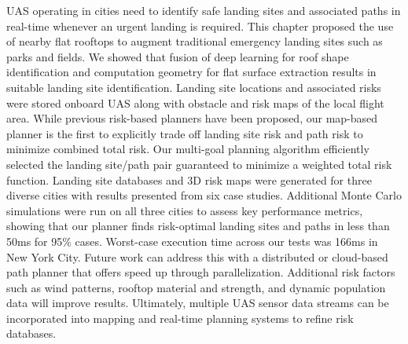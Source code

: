 \ac{UAS} operating in cities need to identify safe landing sites and associated paths in real-time whenever an urgent landing is required. This chapter proposed the use of nearby flat rooftops to augment traditional emergency landing sites such as parks and fields. We showed that fusion of deep learning for roof shape identification and computation geometry for flat surface extraction results in suitable landing site identification.  Landing site locations and associated risks were stored onboard \ac{UAS} along with obstacle and risk maps of the local flight area.
While previous risk-based planners have been proposed, our map-based planner is the first to explicitly trade off landing site risk and path risk to minimize combined total risk. Our multi-goal planning algorithm efficiently selected the landing site/path pair guaranteed to minimize a weighted total risk function. Landing site databases and 3D risk maps were generated for three diverse cities with results presented from six case studies. Additional Monte Carlo simulations were run on all three cities to assess key performance metrics, showing that our planner finds risk-optimal landing sites and paths in less than 50ms for 95\% cases. Worst-case execution time across our tests was 166ms in New York City. Future work can address this with a distributed or cloud-based path planner that offers speed up through parallelization. Additional risk factors such as wind patterns, rooftop material and strength, and dynamic population data will improve results. Ultimately, multiple \ac{UAS} sensor data streams can be incorporated into mapping and real-time planning systems to refine risk databases.